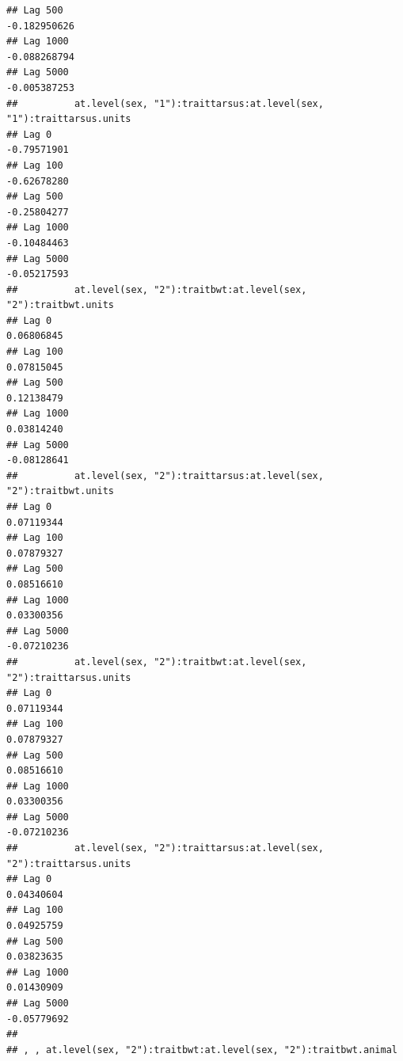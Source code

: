 \documentclass[
  12pt,
]{book}
\begin{document}
\begin{verbatim}
## Lag 500                                                      -0.182950626
## Lag 1000                                                     -0.088268794
## Lag 5000                                                     -0.005387253
##          at.level(sex, "1"):traittarsus:at.level(sex, "1"):traittarsus.units
## Lag 0                                                            -0.79571901
## Lag 100                                                          -0.62678280
## Lag 500                                                          -0.25804277
## Lag 1000                                                         -0.10484463
## Lag 5000                                                         -0.05217593
##          at.level(sex, "2"):traitbwt:at.level(sex, "2"):traitbwt.units
## Lag 0                                                       0.06806845
## Lag 100                                                     0.07815045
## Lag 500                                                     0.12138479
## Lag 1000                                                    0.03814240
## Lag 5000                                                   -0.08128641
##          at.level(sex, "2"):traittarsus:at.level(sex, "2"):traitbwt.units
## Lag 0                                                          0.07119344
## Lag 100                                                        0.07879327
## Lag 500                                                        0.08516610
## Lag 1000                                                       0.03300356
## Lag 5000                                                      -0.07210236
##          at.level(sex, "2"):traitbwt:at.level(sex, "2"):traittarsus.units
## Lag 0                                                          0.07119344
## Lag 100                                                        0.07879327
## Lag 500                                                        0.08516610
## Lag 1000                                                       0.03300356
## Lag 5000                                                      -0.07210236
##          at.level(sex, "2"):traittarsus:at.level(sex, "2"):traittarsus.units
## Lag 0                                                             0.04340604
## Lag 100                                                           0.04925759
## Lag 500                                                           0.03823635
## Lag 1000                                                          0.01430909
## Lag 5000                                                         -0.05779692
## 
## , , at.level(sex, "2"):traitbwt:at.level(sex, "2"):traitbwt.animal

\end{verbatim}
\end{document}
